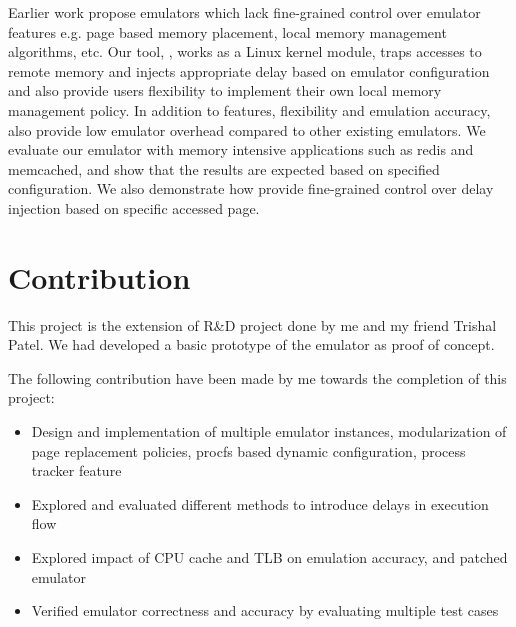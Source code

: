 Earlier work propose emulators which lack fine-grained control over emulator features e.g. page based memory placement, local memory management algorithms, etc. Our tool, {\dime}, works as a Linux kernel module, traps accesses to remote memory and injects appropriate delay based on emulator configuration and also provide users flexibility to implement their own local memory management policy. In addition to features, flexibility and emulation accuracy, {\dime} also provide low emulator overhead compared to other existing emulators. We evaluate our emulator with memory intensive applications such as redis and memcached, and show that the results are expected based on specified configuration. We also demonstrate how {\dime} provide fine-grained control over delay injection based on specific accessed page.

\section{Contribution}
This project is the extension of R\&D project done by me and my friend Trishal Patel. We had developed a basic prototype of the emulator as proof of concept.

The following contribution have been made by me towards the completion of this project:
\begin{itemize}
	\item Design and implementation of multiple emulator instances, modularization of page replacement policies, procfs based dynamic configuration, process tracker feature
	\item Explored and evaluated different methods to introduce delays in execution flow
	\item Explored impact of CPU cache and TLB on emulation accuracy, and patched emulator
	\item Verified emulator correctness and accuracy by evaluating multiple test cases
\end{itemize}


